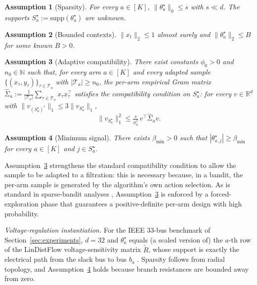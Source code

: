 \documentclass[10pt,journal,twoside,twocolumn]{IEEEtran}
\newtheorem{assumption}{Assumption}
\begin{document}
\begin{assumption}[Sparsity]\label{ass:sparse}
For every $a \in [K]$, $\|\theta^{\star}_a\|_0 \leq s$ with $s \ll d$. The supports $S^{\star}_a := \mathrm{supp}(\theta^{\star}_a)$ are unknown.
\end{assumption}

\begin{assumption}[Bounded contexts]\label{ass:bounded}
$\|x_t\|_2 \leq 1$ almost surely and $\|\theta^{\star}_a\|_2 \leq B$ for some known $B > 0$.
\end{assumption}

\begin{assumption}[Adaptive compatibility]\label{ass:compat}
There exist constants $\phi_0 > 0$ and $n_0 \in \mathbb{N}$ such that, for every arm $a \in [K]$ and every adapted sample $\{(x_\tau, y_\tau)\}_{\tau \in \mathcal{T}_a}$ with $|\mathcal{T}_a| \geq n_0$, the per-arm empirical Gram matrix $\hat{\Sigma}_a := \tfrac{1}{|\mathcal{T}_a|} \sum_{\tau \in \mathcal{T}_a} x_\tau x_\tau^\top$ satisfies the compatibility condition on $S^{\star}_a$: for every $v \in \mathbb{R}^d$ with $\|v_{(S^{\star}_a)^c}\|_1 \leq 3 \|v_{S^{\star}_a}\|_1$,
\[
\|v_{S^{\star}_a}\|_1^2 \leq \tfrac{s}{\phi_0^2}\, v^\top \hat{\Sigma}_a v.
\]
\end{assumption}

\begin{assumption}[Minimum signal]\label{ass:beta}
There exists $\beta_{\min} > 0$ such that $|\theta^{\star}_{a,j}| \geq \beta_{\min}$ for every $a \in [K]$ and $j \in S^{\star}_a$.
\end{assumption}

Assumption~\ref{ass:compat} strengthens the standard compatibility condition \cite{vandegeer2009conditions} to allow the sample to be adapted to a filtration: this is necessary because, in a bandit, the per-arm sample is generated by the algorithm's own action selection. As is standard in sparse-bandit analyses \cite{bastani2020online,oh2021sparsity}, Assumption~\ref{ass:compat} is enforced by a forced-exploration phase that guarantees a positive-definite per-arm design with high probability.

\textit{Voltage-regulation instantiation.} For the IEEE 33-bus benchmark of Section~\ref{sec:experiments}, $d = 32$ and $\theta^{\star}_a$ equals (a scaled version of) the $a$-th row of the LinDistFlow voltage-sensitivity matrix $\widetilde{R}$, whose support is exactly the electrical path from the slack bus to bus $b_a$ \cite{baran1989network,bolognani2015}. Sparsity follows from radial topology, and Assumption~\ref{ass:beta} holds because branch resistances are bounded away from zero.
\end{document}
